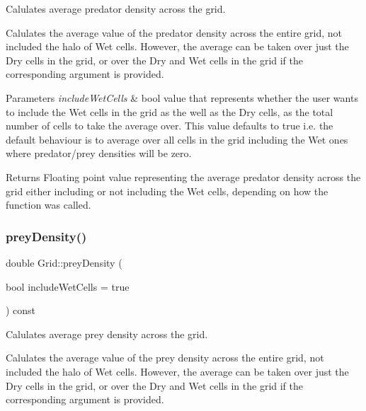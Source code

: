 Calulates average predator density across the grid. 

Calulates the average value of the predator density across the entire grid, not included the halo of Wet cells. However, the average can be taken over just the Dry cells in the grid, or over the Dry and Wet cells in the grid if the corresponding argument is provided.


\begin{DoxyParams}{Parameters}
{\em include\+Wet\+Cells} & bool value that represents whether the user wants to include the Wet cells in the grid as the well as the Dry cells, as the total number of cells to take the average over. This value defaults to true i.\+e. the default behaviour is to average over all cells in the grid including the Wet ones where predator/prey densities will be zero.\\
\hline
\end{DoxyParams}
\begin{DoxyReturn}{Returns}
Floating point value representing the average predator density across the grid either including or not including the Wet cells, depending on how the function was called. 
\end{DoxyReturn}
\mbox{\label{class_grid_a7dc8ae18c31e8e680f6369d7c07ea881}} 
\subsubsection{\texorpdfstring{prey\+Density()}{preyDensity()}}
{\footnotesize\ttfamily double Grid\+::prey\+Density (\begin{DoxyParamCaption}\item[{bool}]{include\+Wet\+Cells = {\ttfamily true} }\end{DoxyParamCaption}) const}



Calulates average prey density across the grid. 

Calulates the average value of the prey density across the entire grid, not included the halo of Wet cells. However, the average can be taken over just the Dry cells in the grid, or over the Dry and Wet cells in the grid if the corresponding argument is provided.


